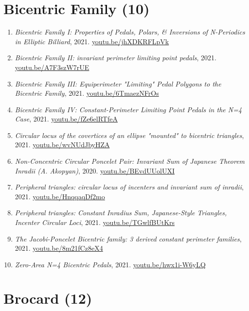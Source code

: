 \documentclass[12pt]{article}
\begin{document}
\section{Bicentric Family (10)}

\begin{enumerate}[resume]
\item \textit{Bicentric Family I: Properties of Pedals, Polars, \& Inversions of N-Periodics in Elliptic Billiard}, 2021. \href{https://youtu.be/jhXDKRFLpVk}{\url{youtu.be/jhXDKRFLpVk}}
\item \textit{Bicentric Family II: invariant perimeter limiting point pedals}, 2021. \href{https://youtu.be/A7F3szW7rUE}{\url{youtu.be/A7F3szW7rUE}}
\item \textit{Bicentric Family III: Equiperimeter "Limiting" Pedal Polygons to the Bicentric Family}, 2021. \href{https://youtu.be/6TmaezNFrOs}{\url{youtu.be/6TmaezNFrOs}}
\item \textit{Bicentric Family IV: Constant-Perimeter Limiting Point Pedals in the N=4 Case}, 2021. \href{https://youtu.be/fZe6elRTfeA}{\url{youtu.be/fZe6elRTfeA}}
\item \textit{Circular locus of the covertices of an ellipse "mounted" to bicentric triangles}, 2021. \href{https://youtu.be/wvNUdJbyHZA}{\url{youtu.be/wvNUdJbyHZA}}
\item \textit{Non-Concentric Circular Poncelet Pair: Invariant Sum of Japanese Theorem Inradii (A. Akopyan)}, 2020. \href{https://youtu.be/BEvdUUolUXI}{\url{youtu.be/BEvdUUolUXI}}
\item \textit{Peripheral triangles: circular locus of incenters and invariant sum of inradii}, 2021. \href{https://youtu.be/HnqqaqDf2mo}{\url{youtu.be/HnqqaqDf2mo}}
\item \textit{Peripheral triangles: Constant Inradius Sum, Japanese-Style Triangles, Incenter Circular Loci}, 2021. \href{https://youtu.be/TGwlfBUtKrs}{\url{youtu.be/TGwlfBUtKrs}}
\item \textit{The Jacobi-Poncelet Bicentric family: 3 derived constant perimeter families}, 2021. \href{https://youtu.be/8m21fCz8eX4}{\url{youtu.be/8m21fCz8eX4}}
\item \textit{Zero-Area N=4 Bicentric Pedals}, 2021. \href{https://youtu.be/hwx1i-W6yLQ}{\url{youtu.be/hwx1i-W6yLQ}}
\end{enumerate}

\section{Brocard (12)}
\end{document}
